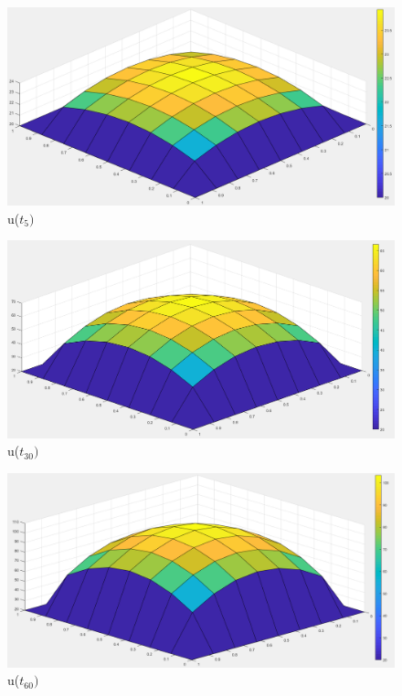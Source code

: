 \documentclass{article}
\begin{document}
\begin{figure}
	\includegraphics[width=\linewidth]{Aufgaben-Ressourcen/P2A5T5.png}
		\caption{u($t_{5})$}
\end{figure}
\begin{figure}
	\includegraphics[width=\linewidth]{Aufgaben-Ressourcen/P2A5T30.png}
		\caption{u($t_{30})$}
\end{figure}
\begin{figure}
	\includegraphics[width=\linewidth]{Aufgaben-Ressourcen/P2A5T60.png}
		\caption{u($t_{60})$}
\end{figure}


	
\end{document}
